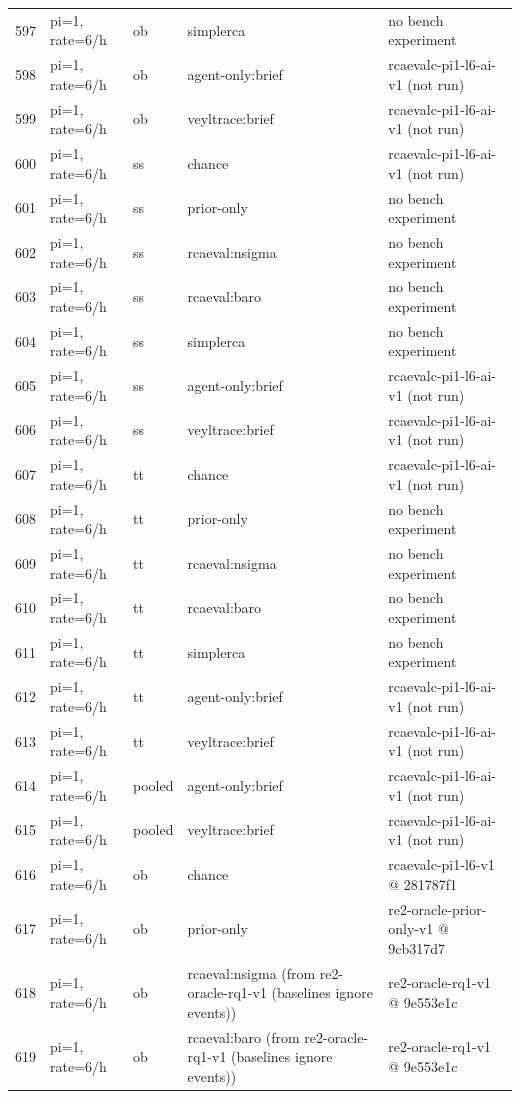 \begin{longtable}{@{}r>{\raggedright\arraybackslash}p{48.0pt}>{\raggedright\arraybackslash}p{18.0pt}>{\raggedright\arraybackslash}p{108.0pt}>{\raggedright\arraybackslash}p{105.0pt}@{}}
597 & pi=1, rate=6/h & ob & simplerca & no bench experiment \\
598 & pi=1, rate=6/h & ob & agent-only:brief & rcaevalc-pi1-l6-ai-v1 (not run) \\
599 & pi=1, rate=6/h & ob & veyltrace:brief & rcaevalc-pi1-l6-ai-v1 (not run) \\
600 & pi=1, rate=6/h & ss & chance & rcaevalc-pi1-l6-ai-v1 (not run) \\
601 & pi=1, rate=6/h & ss & prior-only & no bench experiment \\
602 & pi=1, rate=6/h & ss & rcaeval:nsigma & no bench experiment \\
603 & pi=1, rate=6/h & ss & rcaeval:baro & no bench experiment \\
604 & pi=1, rate=6/h & ss & simplerca & no bench experiment \\
605 & pi=1, rate=6/h & ss & agent-only:brief & rcaevalc-pi1-l6-ai-v1 (not run) \\
606 & pi=1, rate=6/h & ss & veyltrace:brief & rcaevalc-pi1-l6-ai-v1 (not run) \\
607 & pi=1, rate=6/h & tt & chance & rcaevalc-pi1-l6-ai-v1 (not run) \\
608 & pi=1, rate=6/h & tt & prior-only & no bench experiment \\
609 & pi=1, rate=6/h & tt & rcaeval:nsigma & no bench experiment \\
610 & pi=1, rate=6/h & tt & rcaeval:baro & no bench experiment \\
611 & pi=1, rate=6/h & tt & simplerca & no bench experiment \\
612 & pi=1, rate=6/h & tt & agent-only:brief & rcaevalc-pi1-l6-ai-v1 (not run) \\
613 & pi=1, rate=6/h & tt & veyltrace:brief & rcaevalc-pi1-l6-ai-v1 (not run) \\
614 & pi=1, rate=6/h & pooled & agent-only:brief & rcaevalc-pi1-l6-ai-v1 (not run) \\
615 & pi=1, rate=6/h & pooled & veyltrace:brief & rcaevalc-pi1-l6-ai-v1 (not run) \\
616 & pi=1, rate=6/h & ob & chance & rcaevalc-pi1-l6-v1 @ 281787f1 \\
617 & pi=1, rate=6/h & ob & prior-only & re2-oracle-prior-only-v1 @ 9cb317d7 \\
618 & pi=1, rate=6/h & ob & rcaeval:nsigma (from re2-oracle-rq1-v1 (baselines ignore events)) & re2-oracle-rq1-v1 @ 9e553e1c \\
619 & pi=1, rate=6/h & ob & rcaeval:baro (from re2-oracle-rq1-v1 (baselines ignore events)) & re2-oracle-rq1-v1 @ 9e553e1c \\

\end{longtable}
